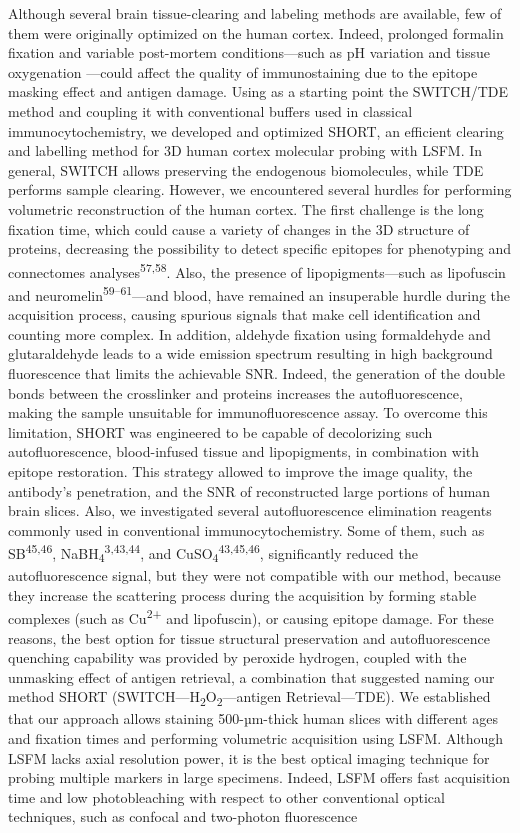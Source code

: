 \documentclass{article}
\begin{document}
Although several brain tissue-clearing and labeling methods are available, few of them were originally optimized on the human cortex. Indeed, prolonged formalin fixation and variable post-mortem conditions—such as pH variation and tissue oxygenation —could affect the quality of immunostaining due to the epitope masking effect and antigen damage. Using as a starting point the SWITCH/TDE method and coupling it with conventional buffers used in classical immunocytochemistry, we developed and optimized SHORT, an efficient clearing and labelling method for 3D human cortex molecular probing with LSFM. In general, SWITCH allows preserving the endogenous biomolecules, while TDE performs sample clearing. However, we encountered several hurdles for performing volumetric reconstruction of the human cortex. The first challenge is the long fixation time, which could cause a variety of changes in the 3D structure of proteins, decreasing the possibility to detect specific epitopes for phenotyping and connectomes analyses\textsuperscript{57,58}. Also, the presence of lipopigments—such as lipofuscin and neuromelin\textsuperscript{59–61}—and blood, have remained an insuperable hurdle during the acquisition process, causing spurious signals that make cell identification and counting more complex. In addition, aldehyde fixation using formaldehyde and glutaraldehyde leads to a wide emission spectrum resulting in high background fluorescence that limits the achievable SNR. Indeed, the generation of the double bonds between the crosslinker and proteins increases the autofluorescence, making the sample unsuitable for immunofluorescence assay. To overcome this limitation, SHORT was engineered to be capable of decolorizing such autofluorescence, blood-infused tissue and lipopigments, in combination with epitope restoration. This strategy allowed to improve the image quality, the antibody’s penetration, and the SNR of reconstructed large portions of human brain slices. Also, we investigated several autofluorescence elimination reagents commonly used in conventional immunocytochemistry. Some of them, such as SB\textsuperscript{45,46}, NaBH\textsubscript{4}\textsuperscript{3,43,44}, and CuSO\textsubscript{4}\textsuperscript{43,45,46}, significantly reduced the autofluorescence signal, but they were not compatible with our method, because they increase the scattering process during the acquisition by forming stable complexes (such as Cu\textsuperscript{2+} and lipofuscin), or causing epitope damage. For these reasons, the best option for tissue structural preservation and autofluorescence quenching capability was provided by peroxide hydrogen, coupled with the unmasking effect of antigen retrieval, a combination that suggested naming our method SHORT (SWITCH—H\textsubscript{2}O\textsubscript{2}—antigen Retrieval—TDE). We established that our approach allows staining 500-µm-thick human slices with different ages and fixation times and performing volumetric acquisition using LSFM. Although LSFM lacks axial resolution power, it is the best optical imaging technique for probing multiple markers in large specimens. Indeed, LSFM offers fast acquisition time and low photobleaching with respect to other conventional optical techniques, such as confocal and two-photon fluorescence 
\end{document}
